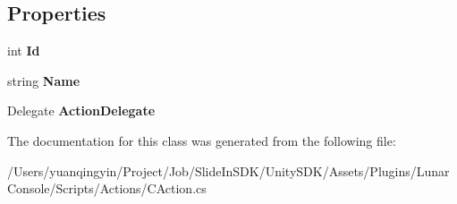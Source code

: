 \subsection*{Properties}
\begin{DoxyCompactItemize}
\item 
\mbox{\label{class_lunar_console_plugin_internal_1_1_c_action_a479d01fbfb337b6b5c8584423f07d166}} 
int {\bfseries Id}
\item 
\mbox{\label{class_lunar_console_plugin_internal_1_1_c_action_aada89d781135bd1ee7f73622a6fab249}} 
string {\bfseries Name}
\item 
\mbox{\label{class_lunar_console_plugin_internal_1_1_c_action_acf125a5941c248bff86f7120a82302e2}} 
Delegate {\bfseries Action\+Delegate}
\end{DoxyCompactItemize}


The documentation for this class was generated from the following file\+:\begin{DoxyCompactItemize}
\item 
/\+Users/yuanqingyin/\+Project/\+Job/\+Slide\+In\+S\+D\+K/\+Unity\+S\+D\+K/\+Assets/\+Plugins/\+Lunar\+Console/\+Scripts/\+Actions/C\+Action.\+cs\end{DoxyCompactItemize}
